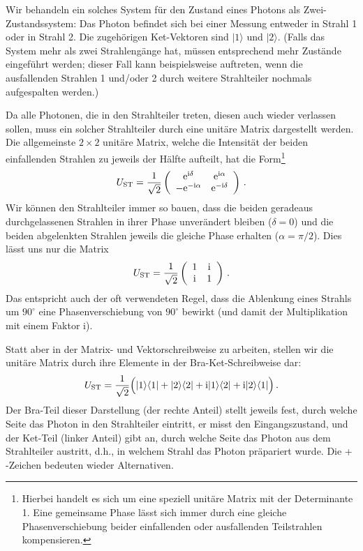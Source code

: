 Wir behandeln ein solches System f\"ur den Zustand eines Photons als
Zwei-Zustandssystem: Das Photon befindet sich bei einer Messung entweder in Strahl 1 oder in Strahl 2. 
Die zugeh\"origen Ket-Vektoren sind $|1\rangle$ und $|2\rangle$. (Falls das System mehr
als zwei Strahleng\"ange hat, m\"ussen entsprechend mehr Zust\"ande eingef\"uhrt
werden; dieser Fall kann beispielsweise auftreten, wenn die ausfallenden Strahlen 1 und/oder 2 durch weitere
Strahlteiler nochmals aufgespalten werden.) 

Da alle Photonen, die in den Strahlteiler treten, diesen auch wieder verlassen sollen, muss
ein solcher Strahlteiler durch eine unit\"are Matrix dargestellt werden. Die allgemeinste
$2\times 2$ unit\"are Matrix, welche die Intensit\"at der beiden einfallenden Strahlen zu jeweils
der H\"alfte aufteilt, hat die Form\footnote{Hierbei
handelt es sich um eine speziell unit\"are Matrix mit der Determinante 1. Eine
gemeinsame Phase l\"asst sich immer durch eine gleiche Phasenverschiebung beider
einfallenden oder ausfallenden Teilstrahlen kompensieren.}
\begin{equation}
            U_{\rm ST} = \frac{1}{\sqrt{2}} 
            \left( \begin{array}{cc} {\rm e}^{{\rm i} \delta} & {\rm e}^{{\rm i} \alpha} \\
            -{\rm e}^{-{\rm i} \alpha} & {\rm e}^{- {\rm i} \delta}  \end{array} \right) \, .
\end{equation}
Wir k\"onnen den Strahlteiler immer so bauen, dass die beiden
geradeaus durchgelassenen Strahlen in ihrer Phase unver\"andert bleiben ($\delta=0$) und
die beiden abgelenkten Strahlen jeweils die gleiche Phase erhalten ($\alpha=\pi/2$). Dies l\"asst uns nur die
Matrix
\begin{equation}
            U_{\rm ST} = \frac{1}{\sqrt{2}} 
            \left( \begin{array}{cc} 1 & {\rm i} \\
           {\rm i}  & 1  \end{array} \right) \, .
\end{equation}
Das entspricht auch der oft verwendeten Regel, dass die Ablenkung eines Strahls um 
$90^\circ$ eine Phasenverschiebung von $90^\circ$ bewirkt (und damit der Multiplikation mit
einem Faktor i). 

Statt aber in der Matrix- und Vektorschreibweise zu arbeiten, stellen wir die unit\"are Matrix
durch ihre Elemente in der Bra-Ket-Schreibweise dar:
\begin{equation}
\label{eq_BK_UTerme}
            U_{\rm ST} = \frac{1}{\sqrt{2}} \Big(  | 1 \rangle \langle 1 | + | 2 \rangle \langle 2 | +
          {\rm i}  | 1 \rangle \langle 2 | + {\rm i} | 2 \rangle \langle 1 |  \Big) \, .
\end{equation}
Der Bra-Teil dieser Darstellung (der rechte Anteil) stellt jeweils fest, durch welche Seite das Photon in den
Strahlteiler eintritt, er \glqq misst den Eingangszustand\grqq, und der Ket-Teil (linker Anteil) gibt an,
durch welche Seite das Photon aus dem Strahlteiler austritt, d.h., in welchem Strahl das
Photon pr\"apariert wurde. Die \glqq + \grqq-Zeichen bedeuten wieder Alternativen.

